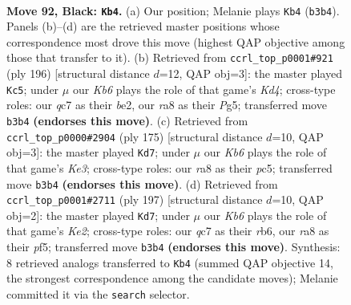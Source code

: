 \documentclass[11pt]{article}
\begin{document}
\clearpage

\begin{figure}[p]\centering
\begin{subfigure}{0.46\textwidth}\centering
\resizebox{\linewidth}{!}{%
\newchessgame
\chessboard[
  setfen={R7/2Q5/6p1/5p2/5P2/1k6/6K1/8 b - - 4 92},
  showmover=false,
  pgfstyle=straightmove, color=movearrow, markmove={b3-b4}
]}
\caption{}
\end{subfigure}\hfill
\begin{subfigure}{0.46\textwidth}\centering
\resizebox{\linewidth}{!}{%
\newchessgame
\chessboard[
  setfen={5k2/8/7P/pp4P1/3K4/P7/4b3/8 w - - 63 99},
  showmover=false,
  pgfstyle=straightmove, color=movearrow, markmove={d4-c5}
]}
\caption{}
\end{subfigure}
\\[4pt]
\begin{subfigure}{0.46\textwidth}\centering
\resizebox{\linewidth}{!}{%
\newchessgame
\chessboard[
  setfen={8/8/4k3/2P3p1/3K1pP1/8/8/8 b - - 0 88},
  showmover=false,
  pgfstyle=straightmove, color=movearrow, markmove={e6-d7}
]}
\caption{}
\end{subfigure}\hfill
\begin{subfigure}{0.46\textwidth}\centering
\resizebox{\linewidth}{!}{%
\newchessgame
\chessboard[
  setfen={8/4k3/1R6/3p1PK1/3Pp3/r7/8/8 b - - 0 99},
  showmover=false,
  pgfstyle=straightmove, color=movearrow, markmove={e7-d7}
]}
\caption{}
\end{subfigure}
\caption{\textbf{Move 92, Black: \texttt{Kb4}.} (a) Our position; Melanie plays \texttt{Kb4} (\texttt{b3b4}). Panels (b)--(d) are the retrieved master positions whose correspondence most drove this move (highest QAP objective among those that transfer to it). (b) Retrieved from \texttt{ccrl\_top\_p0001\#921} (ply 196) [structural distance $d$=12, QAP obj=3]: the master played \texttt{Kc5}; under $\mu$ our \emph{Kb6} plays the role of that game's \emph{Kd4}; cross-type roles: our \emph{q}c7 as their \emph{b}e2, our \emph{r}a8 as their \emph{P}g5; transferred move \texttt{b3b4} \textbf{(endorses this move)}. (c) Retrieved from \texttt{ccrl\_top\_p0000\#2904} (ply 175) [structural distance $d$=10, QAP obj=3]: the master played \texttt{Kd7}; under $\mu$ our \emph{Kb6} plays the role of that game's \emph{Ke3}; cross-type roles: our \emph{r}a8 as their \emph{p}c5; transferred move \texttt{b3b4} \textbf{(endorses this move)}. (d) Retrieved from \texttt{ccrl\_top\_p0001\#2711} (ply 197) [structural distance $d$=10, QAP obj=2]: the master played \texttt{Kd7}; under $\mu$ our \emph{Kb6} plays the role of that game's \emph{Ke2}; cross-type roles: our \emph{q}c7 as their \emph{r}b6, our \emph{r}a8 as their \emph{p}f5; transferred move \texttt{b3b4} \textbf{(endorses this move)}. Synthesis: 8 retrieved analogs transferred to \texttt{Kb4} (summed QAP objective 14, the strongest correspondence among the candidate moves); Melanie committed it via the \texttt{search} selector.}
\label{fig:thought-m183}
\end{figure}
\end{document}
